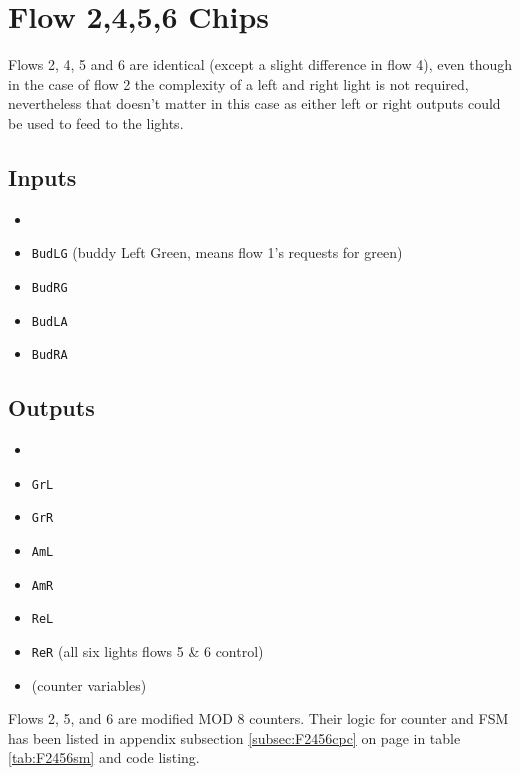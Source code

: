\section{Flow 2,4,5,6 Chips}
Flows 2, 4, 5 and 6 are identical (except a slight difference in flow 4), even
though in the case of flow 2 the complexity of a left and right light is not
required, nevertheless that doesn't matter in this case as either left or right
outputs could be used to feed to the lights. 

\subsection{Inputs}
\begin{itemize}
  \item \EN
  \item \texttt{BudLG} (buddy Left Green, means flow 1's requests for green)
  \item \texttt{BudRG}
  \item \texttt{BudLA}
  \item \texttt{BudRA}
\end{itemize}

\subsection{Outputs}
\begin{itemize}
  \item \FF
  \item \texttt{GrL}
  \item \texttt{GrR}
  \item \texttt{AmL}
  \item \texttt{AmR}
  \item \texttt{ReL}
  \item \texttt{ReR}  (all six lights flows 5 \& 6 control)
  \item \Q{[0\ldots2]} (counter variables)
\end{itemize}

Flows 2, 5, and 6 are modified MOD 8 counters. Their logic for counter and FSM
has been listed in appendix subsection \ref{subsec:F2456cpc} on page
\pageref{subsec:F2456cpc} in table \ref{tab:F2456sm} and code listing.